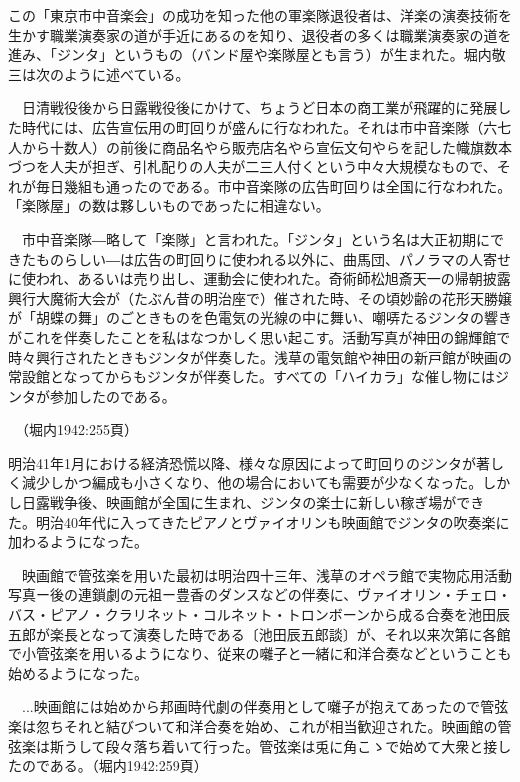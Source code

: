 この「東京市中音楽会」の成功を知った他の軍楽隊退役者は、洋楽の演奏技術を生かす職業演奏家の道が手近にあるのを知り、退役者の多くは職業演奏家の道を進み、「ジンタ」というもの（バンド屋や楽隊屋とも言う）が生まれた。堀内敬三は次のように述べている。

\begin{gquote}
　日清戦役後から日露戦役後にかけて、ちょうど日本の商工業が飛躍的に発展した時代には、広告宣伝用の町回りが盛んに行なわれた。それは市中音楽隊（六七人から十数人）の前後に商品名やら販売店名やら宣伝文句やらを記した幟旗数本づつを人夫が担ぎ、引札配りの人夫が二三人付くという中々大規模なもので、それが毎日幾組も通ったのである。市中音楽隊の広告町回りは全国に行なわれた。「楽隊屋」の数は夥しいものであったに相違ない。\par{}　市中音楽隊―略して「楽隊」と言われた。「ジンタ」という名は大正初期にできたものらしい―は広告の町回りに使われる以外に、曲馬団、パノラマの人寄せに使われ、あるいは売り出し、運動会に使われた。奇術師松旭斎天一の帰朝披露興行大魔術大会が（たぶん昔の明治座で）催された時、その頃妙齢の花形天勝嬢が「胡蝶の舞」のごときものを色電気の光線の中に舞い、嘲哢たるジンタの響きがこれを伴奏したことを私はなつかしく思い起こす。活動写真が神田の錦輝館で時々興行されたときもジンタが伴奏した。浅草の電気館や神田の新戸館が映画の常設館となってからもジンタが伴奏した。すべての「ハイカラ」な催し物にはジンタが参加したのである。\par{}　（堀内1942:255頁）
\end{gquote}

明治41年1月における経済恐慌以降、様々な原因によって町回りのジンタが著しく減少しかつ編成も小さくなり、他の場合においても需要が少なくなった。しかし日露戦争後、映画館が全国に生まれ、ジンタの楽士に新しい稼ぎ場ができた。明治40年代に入ってきたピアノとヴァイオリンも映画館でジンタの吹奏楽に加わるようになった。

\begin{gquote}
　映画館で管弦楽を用いた最初は明治四十三年、浅草のオペラ館で実物応用活動写真ー後の連鎖劇の元祖ー豊香のダンスなどの伴奏に、ヴァイオリン・チェロ・バス・ピアノ・クラリネット・コルネット・トロンボーンから成る合奏を池田辰五郎が楽長となって演奏した時である〔池田辰五郎談〕が、それ以来次第に各館で小管弦楽を用いるようになり、従来の囃子と一緒に和洋合奏などということも始めるようになった。\par{}　...映画館には始めから邦画時代劇の伴奏用として囃子が抱えてあったので管弦楽は忽ちそれと結びついて和洋合奏を始め、これが相当歓迎された。映画館の管弦楽は斯うして段々落ち着いて行った。管弦楽は兎に角こゝで始めて大衆と接したのである。（堀内1942:259頁）
\end{gquote}

